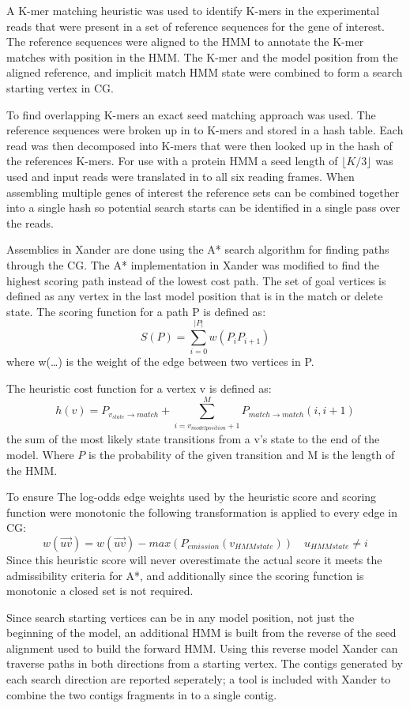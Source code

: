 \documentclass[10pt]{bmc_article}
\newenvironment{bmcformat}{\begin{raggedright}\baselineskip20pt\sloppy\setboolean{publ}{false}}{\end{raggedright}\baselineskip20pt\sloppy}
\begin{document}
\begin{bmcformat}
A K-mer matching heuristic was used to identify K-mers in the experimental reads that were present in a set of reference sequences for the gene of interest.  The reference sequences were aligned to the HMM to annotate the K-mer matches with position in the HMM.  The K-mer and the model position from the aligned reference, and implicit match HMM state were combined to form a search starting vertex in CG.

To find overlapping K-mers an exact seed matching approach was used. The reference sequences were broken up in to K-mers and stored in a hash table. Each read was then decomposed into K-mers that were then looked up in the hash of the references K-mers.  For use with a protein HMM a seed length of $\lfloor K/3\rfloor$ was used and input reads were translated in to all six reading frames. When assembling multiple genes of interest the reference sets can be combined together into a single hash so potential search starts can be identified in a single pass over the reads.

Assemblies in Xander are done using the A* search algorithm\cite{Hart1968} for finding paths through the CG.  The A* implementation in Xander was  modified to find the highest scoring path instead of the lowest cost path. The set of goal vertices is defined as any vertex in the last model position that is in the match or delete state.  The scoring function for a path P is defined as: 
\[S(P) = \sum_{i=0}^{|P|}w(P_iP_{i+1})\] 
where w(\ldots) is the weight of the edge between two vertices in P.

The heuristic cost function for a vertex v is defined as:
\[h(v) = P_{v_{state}\rightarrow match} + \sum_{i=v_{model position} + 1}^{M}P_{match\rightarrow match}(i, i + 1)\]
the sum of the most likely state transitions from a v's state to the end of the model. Where $P$ is the probability of the given transition and M is the length of the HMM.

To ensure The log-odds edge weights used by the heuristic score and scoring function were monotonic the following transformation is applied to every edge in CG:
\[ w(\overrightarrow{uv}) = w(\overrightarrow{uv}) - max(P_{emission}(v_{HMM state})) \quad u_{HMM state} \ne i\]
Since this heuristic score will never overestimate the actual score it meets the admissibility criteria for A*, and additionally since the scoring function is monotonic a closed set is not required.

Since search starting vertices can be in any model position, not just the beginning of the model, an additional HMM is built from the reverse of the seed alignment used to build the forward HMM.  Using this reverse model Xander can traverse paths in both directions from a starting vertex.  The contigs generated by each search direction are reported seperately; a tool is included with Xander to combine the two contigs fragments in to a single contig.


\end{bmcformat}
\end{document}
